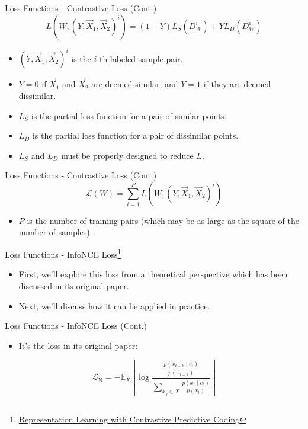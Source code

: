 \documentclass[serif, aspectratio=169]{beamer}
\begin{document}
\begin{frame}{Loss Functions - Contrastive Loss (Cont.)}
\begin{equation*}
L\left(W,\left(Y, \vec{X}_1, \vec{X}_2\right)^i\right)=(1-Y) L_S\left(D_W^i\right)+Y L_D\left(D_W^i\right)
\end{equation*}

    \begin{itemize}
        \item $\left(Y, \vec{X}_1, \vec{X}_2\right)^i$ is the $i$-th labeled sample pair.
        \item $Y=0$ if $\vec{X}_1$ and $\vec{X}_2$ are deemed similar, and $Y=1$ if they are deemed dissimilar.
        \item $L_S$ is the partial loss function for a pair of similar points.
        \item $L_D$ is the partial loss function for a pair of dissimilar points.
        \item $L_S$ and $L_D$ must be properly designed to reduce $L$.
    \end{itemize}
\end{frame}


\begin{frame}{Loss Functions - Contrastive Loss (Cont.)}
\begin{equation*}
\mathcal{L}(W)=\sum_{i=1}^P L\left(W,\left(Y, \vec{X}_1, \vec{X}_2\right)^i\right)
\end{equation*}

    \begin{itemize}
        \item $P$ is the number of training pairs (which may be as large as the
square of the number of samples).
    \end{itemize}
\end{frame}


 \begin{frame}{Loss Functions - InfoNCE Loss\footnote{\href{https://arxiv.org/pdf/1807.03748v2}{Representation Learning with Contrastive Predictive Coding}}}
     \begin{itemize}
         \item First, we'll explore this loss from a theoretical perspective which has been discussed in its original paper.
         \item Next, we'll discuss how it can be applied in practice.
     \end{itemize}
 \end{frame}


\begin{frame}{Loss Functions - InfoNCE Loss (Cont.)}
     \begin{itemize}
         \item It's the loss in its original paper:
     \end{itemize}

     \begin{equation*}
         \mathcal{L}_{\mathrm{N}}=-{\mathbb{E}_X}\left[\log \frac
         {\frac{p\left(x_{t+k} \mid c_t\right)}{p\left(x_{t+k}\right)}}
         {\sum_{x_j \in X} \frac{p\left(x_{t} \mid c_t\right)}{p\left(x_{t}\right)}}
         \right]
     \end{equation*}
\end{frame}
\end{document}
